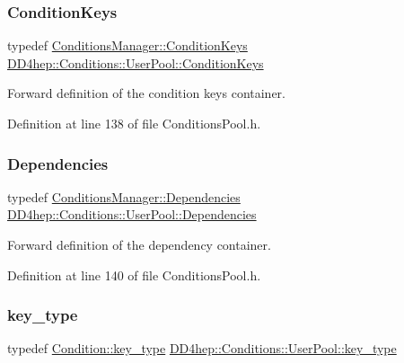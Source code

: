 \subsubsection{\texorpdfstring{Condition\+Keys}{ConditionKeys}}
{\footnotesize\ttfamily typedef \hyperlink{class_d_d4hep_1_1_conditions_1_1_conditions_manager_a8dd76f9acef2c8d3b7970e266fe7eff6}{Conditions\+Manager\+::\+Condition\+Keys} \hyperlink{class_d_d4hep_1_1_conditions_1_1_user_pool_a6282d01af77401a4c20f08391d18cc95}{D\+D4hep\+::\+Conditions\+::\+User\+Pool\+::\+Condition\+Keys}}



Forward definition of the condition keys container. 



Definition at line 138 of file Conditions\+Pool.\+h.

\hypertarget{class_d_d4hep_1_1_conditions_1_1_user_pool_a0da9a8bee4190e4deebf83102902118d}{}\label{class_d_d4hep_1_1_conditions_1_1_user_pool_a0da9a8bee4190e4deebf83102902118d} 
\subsubsection{\texorpdfstring{Dependencies}{Dependencies}}
{\footnotesize\ttfamily typedef \hyperlink{class_d_d4hep_1_1_conditions_1_1_conditions_manager_aab778cfbe096ae8ad20a0bdbb047ad32}{Conditions\+Manager\+::\+Dependencies} \hyperlink{class_d_d4hep_1_1_conditions_1_1_user_pool_a0da9a8bee4190e4deebf83102902118d}{D\+D4hep\+::\+Conditions\+::\+User\+Pool\+::\+Dependencies}}



Forward definition of the dependency container. 



Definition at line 140 of file Conditions\+Pool.\+h.

\hypertarget{class_d_d4hep_1_1_conditions_1_1_user_pool_aa256cf1e22de1b9f2a84d39309b8bfa9}{}\label{class_d_d4hep_1_1_conditions_1_1_user_pool_aa256cf1e22de1b9f2a84d39309b8bfa9} 
\subsubsection{\texorpdfstring{key\+\_\+type}{key\_type}}
{\footnotesize\ttfamily typedef \hyperlink{class_d_d4hep_1_1_conditions_1_1_condition_a7528efa762e8cc072ef80ea67c3531f9}{Condition\+::key\+\_\+type} \hyperlink{class_d_d4hep_1_1_conditions_1_1_user_pool_aa256cf1e22de1b9f2a84d39309b8bfa9}{D\+D4hep\+::\+Conditions\+::\+User\+Pool\+::key\+\_\+type}}



